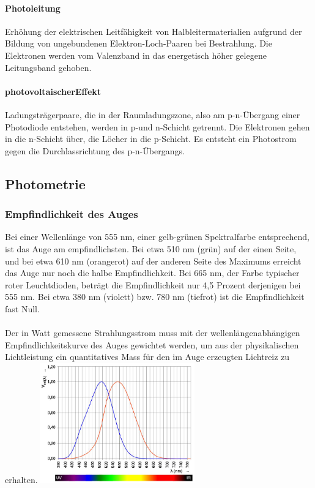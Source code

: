 \paragraph{Photoleitung}
Erhöhung der elektrischen Leitfähigkeit von Halbleitermaterialien aufgrund der Bildung von ungebundenen Elektron-Loch-Paaren bei Bestrahlung. Die Elektronen werden vom Valenzband in das energetisch höher gelegene Leitungsband gehoben.

\paragraph{photovoltaischerEffekt}
Ladungsträgerpaare, die in der Raumladungszone, also am p-n-Übergang einer Photodiode entstehen, werden in p-und n-Schicht getrennt. Die Elektronen gehen in die n-Schicht über, die Löcher in die p-Schicht. Es entsteht ein Photostrom gegen die Durchlassrichtung des p-n-Übergangs.

\begin{multicols}{2}
\subsection{Photometrie}
\subsubsection{Empfindlichkeit des Auges}
Bei einer Wellenlänge von 555 nm, einer gelb-grünen Spektralfarbe entsprechend, ist das Auge am empfindlichsten. Bei etwa 510 nm (grün) auf der einen Seite, und bei etwa 610 nm (orangerot) auf der anderen Seite des Maximums erreicht das Auge nur noch die halbe Empfindlichkeit. Bei 665 nm, der Farbe typischer roter Leuchtdioden, beträgt die Empfindlichkeit nur 4,5 Prozent derjenigen bei 555 nm. Bei etwa 380 nm (violett) bzw. 780 nm (tiefrot) ist die Empfindlichkeit fast Null. \\ \\
Der in Watt gemessene Strahlungsstrom muss mit der wellenlängenabhängigen Empfindlichkeitskurve des Auges gewichtet werden, um aus der physikalischen Lichtleistung ein quantitatives Mass für den im Auge erzeugten Lichtreiz zu erhalten.
\includegraphics[width=0.5\textwidth]{images/empfindlichkeit_auge} 
\end{multicols}

